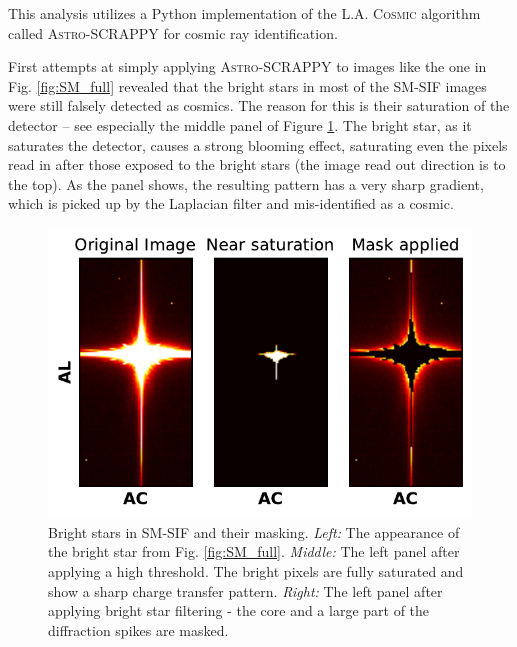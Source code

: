 \documentclass[a4paper, 11pt]{article}
\begin{document}
This analysis utilizes a Python implementation of the \textsc{L.A. Cosmic} algorithm called \textsc{Astro-SCRAPPY} \cite{astroscrappy} for cosmic ray identification.

First attempts at simply applying \textsc{Astro-SCRAPPY} to images like the one in Fig. \ref{fig:SM_full} revealed that the bright stars in most of the SM-SIF images were still falsely detected as cosmics. The reason for this is their saturation of the detector -- see especially the middle panel of Figure \ref{fig:SM_starmask}. The bright star, as it saturates the detector, causes a strong blooming effect, saturating even the pixels read in after those exposed to the bright stars (the image read out direction is to the top). As the panel shows, the resulting pattern has a very sharp gradient, which is picked up by the Laplacian filter and mis-identified as a cosmic.

\begin{figure}
  \centering
  \includegraphics{images/extraction/SM_starmask}
  \caption{Bright stars in SM-SIF and their masking. \textit{Left:} The appearance of the bright star from Fig. \ref{fig:SM_full}. \textit{Middle:} The left panel after applying a high threshold. The bright pixels are fully saturated and show a sharp charge transfer pattern. \textit{Right:} The left panel after applying bright star filtering - the core and a large part of the diffraction spikes are masked.}
  \label{fig:SM_starmask}
\end{figure}
\end{document}

